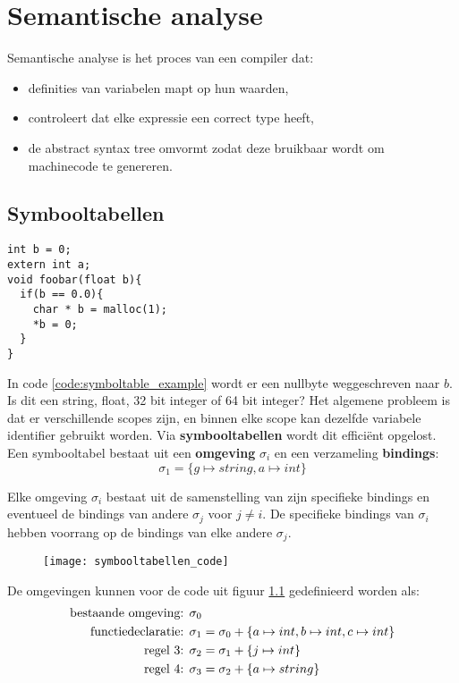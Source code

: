 \chapter{Semantische analyse}
\label{ch:semantische_analyse}

Semantische analyse is het proces van een compiler dat:
\begin{itemize}
	\item definities van variabelen mapt op hun waarden,
	\item controleert dat elke expressie een correct type heeft,
	\item de abstract syntax tree omvormt zodat deze bruikbaar wordt om machinecode te genereren.
\end{itemize}

\section{Symbooltabellen}
\begin{lstlisting}[caption={Het scopeprobleem.},captionpos=b,label={code:symboltable_example}]
int b = 0;
extern int a;
void foobar(float b){
  if(b == 0.0){
    char * b = malloc(1);
    *b = 0;
  }
}
\end{lstlisting}

In code \protect\ref{code:symboltable_example} wordt er een nullbyte weggeschreven naar $b$. Is dit een string, float, 32 bit integer of 64 bit integer? Het algemene probleem is dat er verschillende scopes zijn, en binnen elke scope kan dezelfde variabele identifier gebruikt worden. Via \textbf{symbooltabellen} wordt dit efficiënt opgelost.
Een symbooltabel bestaat uit een \textbf{omgeving} $\sigma_i$ en een verzameling \textbf{bindings}:
$$\sigma_1 = \{g \mapsto string, a \mapsto int\}$$

Elke omgeving $\sigma_i$ bestaat uit de samenstelling van zijn specifieke bindings en eventueel de bindings van andere $\sigma_{j}$ voor $j \neq i$. De specifieke bindings van $\sigma_i$ hebben voorrang op de bindings van elke andere $\sigma_{j}$.

\begin{figure}[h]
	\centering
	\texttt{[image: symbooltabellen\_code]}
	\caption{}
	\label{fig:symbooltabellen_code}
\end{figure}

De omgevingen kunnen voor de code uit figuur \ref{fig:symbooltabellen_code} gedefinieerd worden als:
\begin{equation*}
	\begin{split}
		\hbox{bestaande omgeving: } & \sigma_0 \\
		\hbox{functiedeclaratie: } & \sigma_1 = \sigma_0 + \{a \mapsto int, b \mapsto int, c \mapsto int\} \\ 
		\hbox{regel 3: } & \sigma_2 = \sigma_1 + \{j \mapsto int \} \\
		\hbox{regel 4: } & \sigma_3 = \sigma_2 + \{a \mapsto string \} \\
	\end{split}
\end{equation*}


